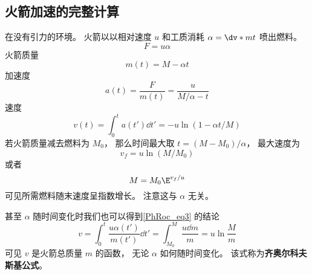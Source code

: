 \subsection{火箭加速的完整计算}
在没有引力的环境。 火箭以以相对速度 $u$ 和工质消耗 $\alpha = \dv*{m}{t}$  喷出燃料。
\begin{equation}
F = u\alpha
\end{equation}
火箭质量
\begin{equation}
m(t) = M - \alpha t
\end{equation}
加速度
\begin{equation}
a(t) = \frac{F}{m(t)} = \frac{u}{M/\alpha - t}
\end{equation}
速度
\begin{equation}
v(t) = \int_0^t a(t') \dd{t'} = -u \ln(1 - \alpha t / M)
\end{equation}
若火箭质量减去燃料为 $M_0$， 那么时间最大取 $t = (M - M_0)/\alpha$， 最大速度为
\begin{equation}
v_f = u \ln(M / M_0)
\end{equation}
或者
\begin{equation}\label{PhRoc_eq3}
M = M_0\E^{v_f/u}
\end{equation}
可见所需燃料随末速度呈指数增长。 注意这与 $\alpha$ 无关。

甚至 $\alpha$ 随时间变化时我们也可以得到\autoref{PhRoc_eq3} 的结论
\begin{equation}
v = \int_0^t \frac{u\alpha(t')}{m(t')}\dd{t'} = \int_{M_0}^M \frac{u\dd{m}}{m} = u\ln{\frac{M}{m}}
\end{equation}
可见 $v$ 是火箭总质量 $m$ 的函数， 无论 $\alpha$ 如何随时间变化。 该式称为\textbf{齐奥尔科夫斯基公式}。
